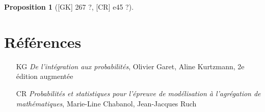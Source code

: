 \documentclass[10pt, a4paper, parskip=full, twoside, twocolumn]{report}
\newtheorem{proposition}[definition]{Proposition}
\begin{document}
\begin{proposition}[\textnormal{[GK] 267 ?, [CR] e45 ?}]
	
\end{proposition}


\section*{Références}
\begin{itemize}
	\item[KG] \emph{De l'intégration aux probabilités}, Olivier Garet, Aline Kurtzmann, 2e édition augmentée
	\item[CR] \emph{Probabilités et statistiques pour l'épreuve de modélisation à l'agrégation de mathématiques}, Marie-Line Chabanol, Jean-Jacques Ruch
\end{itemize}

\end{document}
